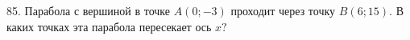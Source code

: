85. Парабола с вершиной в точке $A(0;-3)$ проходит через точку $B(6;15).$ В каких точках эта парабола пересекает ось $x?$\\
